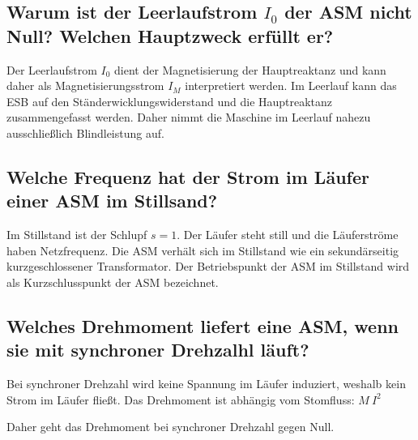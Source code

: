 \documentclass[conference]{IEEEtran}
\begin{document}
\subsection{Warum ist der Leerlaufstrom $I_{0}$ der ASM nicht Null? Welchen Hauptzweck erfüllt er?}

Der Leerlaufstrom $I_{0}$ dient der Magnetisierung der Hauptreaktanz und kann daher als
Magnetisierungsstrom $I_{M}$ interpretiert werden. Im Leerlauf kann das ESB auf den 
Ständerwicklungswiderstand und die Hauptreaktanz zusammengefasst werden. Daher nimmt die Maschine 
im Leerlauf nahezu ausschließlich Blindleistung auf.

\subsection{Welche Frequenz hat der Strom im Läufer einer ASM im Stillsand?}

Im Stillstand ist der Schlupf $s=1$. Der Läufer steht still und die Läuferströme haben Netzfrequenz. 
Die ASM verhält sich im Stillstand wie ein sekundärseitig kurzgeschlossener Transformator. 
Der Betriebspunkt der ASM im Stillstand wird als Kurzschlusspunkt der ASM bezeichnet.

\subsection{Welches Drehmoment liefert eine ASM, wenn sie mit synchroner Drehzalhl läuft?}

Bei synchroner Drehzahl wird keine Spannung im Läufer induziert, weshalb kein Strom im Läufer fließt.
Das Drehmoment ist abhängig vom Stomfluss: $M ~ I^{2}$

Daher geht das Drehmoment bei synchroner Drehzahl gegen Null.
\end{document}
